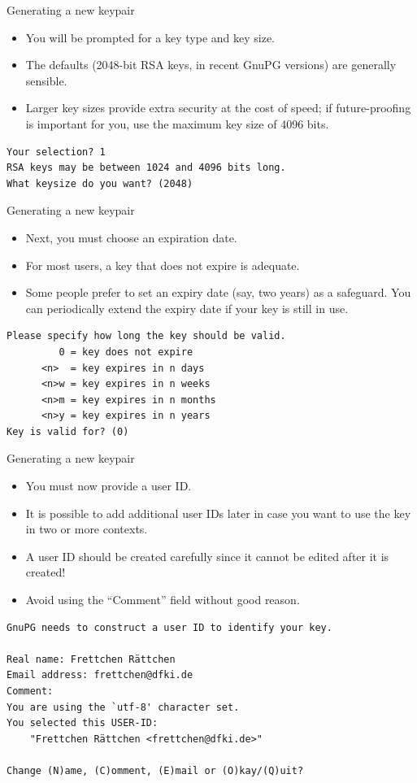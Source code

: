 \documentclass[
mode=present,
paper=smartboard,
size=20pt,
]{powerdot}
\newcommand\vsp{\vspace{-16mm}}
\begin{document}
\begin{slide}[method=direct,toc=]{Generating a new keypair}
  \begin{itemize}
  \item You will be prompted for a key type and key size.
  \item The defaults (2048-bit RSA keys, in recent GnuPG versions) are
    generally sensible.
  \item Larger key sizes provide extra security at the cost of speed;
    if future-proofing is important for you, use the maximum key size
    of 4096 bits.
  \end{itemize}
\begin{verbatim}
Your selection? 1
RSA keys may be between 1024 and 4096 bits long.
What keysize do you want? (2048)
\end{verbatim}
\end{slide}

\begin{slide}[method=direct,toc=]{Generating a new keypair}
  \begin{itemize}
  \item Next, you must choose an expiration date.
  \item For most users, a key that does not expire is adequate.
  \item Some people prefer to set an expiry date (say, two years) as a
    safeguard. You can periodically extend the expiry date if your key
    is still in use.
  \end{itemize}
\begin{verbatim}
Please specify how long the key should be valid.
         0 = key does not expire
      <n>  = key expires in n days
      <n>w = key expires in n weeks
      <n>m = key expires in n months
      <n>y = key expires in n years
Key is valid for? (0)
\end{verbatim}
\end{slide}

\begin{slide}[method=direct,toc=]{Generating a new keypair}
  \begin{itemize}
  \item You must now provide a user ID.
  \item It is possible to add additional user IDs later in case you
    want to use the key in two or more contexts.
  \item A user ID should be created carefully since it cannot be
    edited after it is created!
  \item Avoid using the ``Comment'' field without good reason.
  \end{itemize}
\vsp
\begin{verbatim}
GnuPG needs to construct a user ID to identify your key.

Real name: Frettchen Rättchen
Email address: frettchen@dfki.de
Comment: 
You are using the `utf-8' character set.
You selected this USER-ID:
    "Frettchen Rättchen <frettchen@dfki.de>"

Change (N)ame, (C)omment, (E)mail or (O)kay/(Q)uit?
\end{verbatim}
\end{slide}
\end{document}
